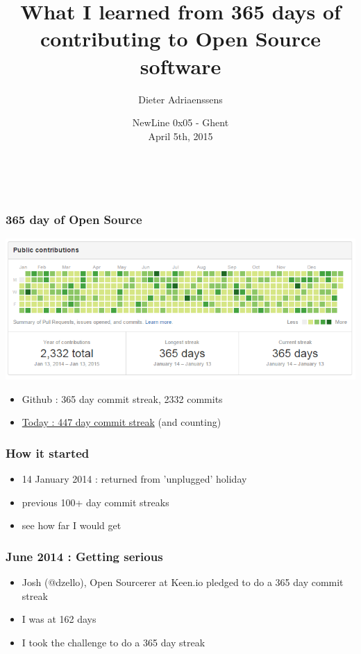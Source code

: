 \documentclass[14pt]{beamer}
\title[365 days of Open Source]{What I learned from 365 days of contributing to Open Source software}
\author{Dieter Adriaenssens}
\institute[]{Open Source developer - @dcadriaenssens}
\date[NewLine 0x05 5Apr2015]{NewLine 0x05 - Ghent\\
April 5th, 2015}
\begin{document}
  \begin{frame}
    \titlepage
    \vfill
    \begin{center}
      \\[2.5ex]
        {\tiny\CcNote{\CcLongnameByNcSa}}
        \vspace*{-2.5ex}
    \end{center}
  \end{frame}
  \begin{frame}
    \frametitle{365 day of Open Source}
    \includegraphics[scale=.45]{github_oss365_13jan2015.png}
    \begin{itemize}
      \item Github : 365 day commit streak, 2332 commits
      \item \href{https://github.com/ruleant}{Today : 447 day commit streak} (and counting)
    \end{itemize}
  \end{frame}
  \begin{frame}
    \frametitle{How it started}
    \begin{itemize}
      \item 14 January 2014 : returned from 'unplugged' holiday
      \item previous 100+ day commit streaks
      \item see how far I would get
    \end{itemize}
  \end{frame}
  \begin{frame}
    \frametitle{June 2014 : Getting serious}
    \begin{itemize}
      \item Josh (@dzello), Open Sourcerer at Keen.io pledged to do a 365 day commit streak
      \item I was at 162 days 
      \item I took the challenge to do a 365 day streak
    \end{itemize}
  \end{frame}
\end{document}
